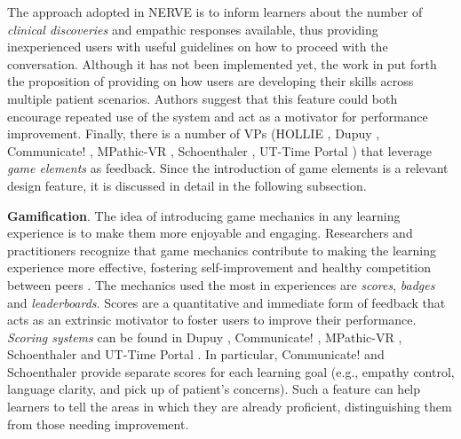 The approach adopted in NERVE \cite{hirumi2016advancing,hirumi2016advancingPart2,kleinsmith2015understanding} is to inform learners about the number of \emph{clinical discoveries} and empathic responses available, thus providing inexperienced users with useful guidelines on how to proceed with the conversation. Although it has not been  implemented yet, the work in  \cite{hirumi2016advancingPart2} put forth the proposition of providing  on how users are developing their skills across multiple patient scenarios. Authors suggest that this feature could both encourage repeated use of the system and act as a motivator for performance improvement. 
Finally, there is a number of VPs (HOLLIE \cite{adefila2020students}, Dupuy \cite{dupuy2019virtual}, Communicate! \cite{jeuring2015communicate}, MPathic-VR \cite{guetterman2019medical,kron2017using}, Schoenthaler \cite{schoenthaler2017simulated}, UT-Time Portal \cite{zielke2016beyond,zielke2016using}) that leverage \emph{game elements} as feedback. Since the introduction of game elements is a relevant design feature, it is discussed in detail in the  following subsection. 


\textbf{Gamification}. The idea of introducing game mechanics in any learning experience is to make them more enjoyable and engaging.  Researchers and practitioners recognize that game mechanics contribute to making the learning experience more effective, fostering self-improvement and healthy competition between peers \cite{benedict2013promotion,festinger1954theory}. 
The mechanics used the most in  experiences are \emph{scores}, \emph{badges} and \emph{leaderboards}. 
Scores are a quantitative and immediate form of feedback that acts as an extrinsic motivator to foster users to improve their performance. \emph{Scoring systems} can be found in Dupuy \cite{dupuy2019virtual}, Communicate! \cite{jeuring2015communicate}, MPathic-VR \cite{guetterman2019medical,kron2017using}, Schoenthaler \cite{schoenthaler2017simulated} and UT-Time Portal \cite{zielke2016beyond,zielke2016using}. In particular, Communicate! \cite{jeuring2015communicate} and Schoenthaler \cite{schoenthaler2017simulated} provide separate scores for each learning goal (e.g., empathy control, language clarity, and pick up of patient's concerns). Such a feature can help learners to tell the areas in which they are already proficient, distinguishing them from those needing improvement.

